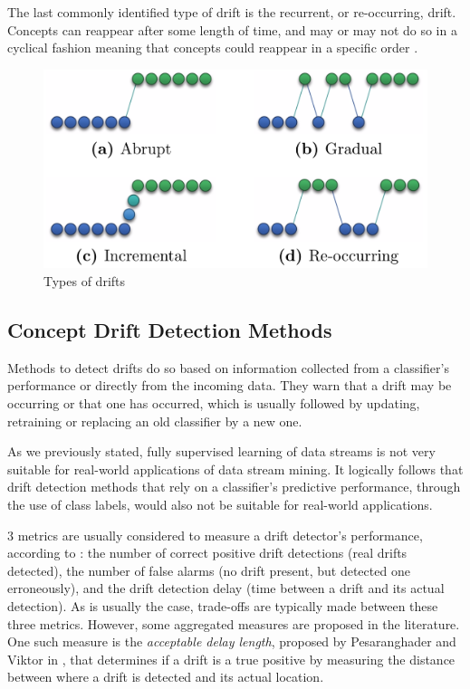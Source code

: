 The last commonly identified type of drift is the recurrent, or re-occurring, drift. Concepts can reappear after some length of time, and may or may not do so in a cyclical fashion meaning that concepts could reappear in a specific order \cite{bifet2018machine, KRAWCZYK2017132, tsymbal2004problem}.


\begin{figure}
  \includegraphics[width=\linewidth]{./images/chapter2/concept-drifts}
\caption{\label{fig:concept-drift-types}Types of drifts \cite{pesaranghader2018reservoirthesis}}
\end{figure}

\subsection{Concept Drift Detection Methods}
Methods to detect drifts do so based on information collected from a classifier's performance or directly from the incoming data. They warn that a drift may be occurring or that one has occurred, which is usually followed by updating, retraining or replacing an old classifier by a new one.

As we previously stated, fully supervised learning of data streams is not very suitable for real-world applications of data stream mining. It logically follows that drift detection methods that rely on a classifier's predictive performance, through the use of class labels, would also not be suitable for real-world applications.

3 metrics are usually considered to measure a drift detector's performance, according to \cite{KRAWCZYK2017132}: the number of correct positive drift detections (real drifts detected), the number of false alarms (no drift present, but detected one erroneously), and the drift detection delay (time between a drift and its actual detection).
As is usually the case, trade-offs are typically made between these three metrics. However, some aggregated measures are proposed in the literature. One such measure is the \textit{acceptable delay length}, proposed by Pesaranghader and Viktor in \cite{pesaranghader2016fast}, that determines if a drift is a true positive by measuring the distance between where a drift is detected and its actual location.

